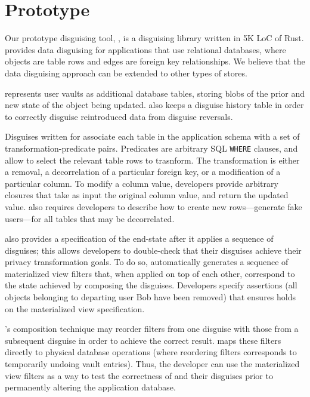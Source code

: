 \section{Prototype}
\label{sec:proto}
%
Our prototype disguising tool, \sys, is a disguising library written in 5K LoC of Rust.
%
\sys provides data disguising for applications that use relational databases, where
objects are table rows and edges are foreign key relationships.
%
We believe that the data disguising approach can be extended to other types of stores.
%

%
\sys represents user vaults as additional database tables, storing blobs of the prior and new state
of the object being updated. \sys also keeps a disguise history table in order to correctly 
disguise reintroduced data from disguise reversals.
%

%
Disguises written for \sys associate each table in the application schema with a set of
transformation-predicate pairs. Predicates are arbitrary SQL \texttt{WHERE} clauses, and allow \sys
to select the relevant table rows to trasnform. The
transformation is either a removal, a decorrelation of a particular foreign key, or a
modification of a particular column. To modify a column value, developers provide arbitrary closures that take as input the original column value, and return the updated value.
%
\sys also requires developers to describe how to create new rows---\eg generate fake users---for all
tables that may be decorrelated.

\sys also provides a specification of the end-state after it applies a sequence of
disguises; this allows developers to double-check that their disguises achieve their privacy
transformation goals.
%
To do so, \sys automatically generates a sequence of materialized view filters that, when applied on top of each
other, correspond to the state achieved by composing the disguises. 
Developers specify assertions (\eg all objects belonging to departing user Bob have
been removed) that \sys ensures holds on the materialized view specification.

\sys's composition technique may reorder filters from one disguise with those from a subsequent disguise in order to achieve the
correct result.
%
\sys maps these filters directly to physical database operations (where reordering filters corresponds to
temporarily undoing vault entries). Thus, the developer can use the materialized view filters as a way to
test the correctness of \sys and their disguises prior to permanently altering the application database. 
